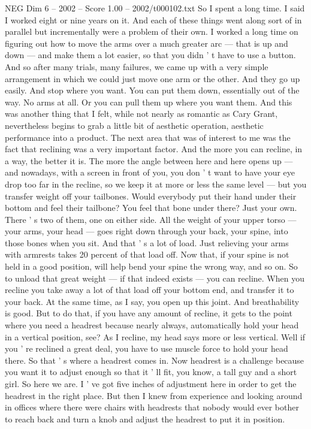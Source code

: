 \begin{textsample}{NEG Dim 6 – 2002 – Score 1.00 – 2002/t000102.txt}
So I spent a long time.
I said I worked eight or nine years on it.
And each of these things went along sort of in parallel but incrementally were a problem of their own.
I worked a long time on figuring out how to move the arms over a much greater arc — that is up and down — and make them a lot easier, so that you didn ' t have to use a button.
And so after many trials, many failures, we came up with a very simple arrangement in which we could just move one arm or the other.
And they go up easily.
And stop where you want.
You can put them down, essentially out of the way.
No arms at all.
Or you can pull them up where you want them.
And this was another thing that I felt, while not nearly as romantic as Cary Grant, nevertheless begins to grab a little bit of aesthetic operation, aesthetic performance into a product.
The next area that was of interest to me was the fact that reclining was a very important factor.
And the more you can recline, in a way, the better it is.
The more the angle between here and here opens up — and nowadays, with a screen in front of you, you don ' t want to have your eye drop too far in the recline, so we keep it at more or less the same level — but you transfer weight off your tailbones.
Would everybody put their hand under their bottom and feel their tailbone?
You feel that bone under there?
Just your own.
There ' s two of them, one on either side.
All the weight of your upper torso — your arms, your head — goes right down through your back, your spine, into those bones when you sit.
And that ' s a lot of load.
Just relieving your arms with armrests takes 20 percent of that load off.
Now that, if your spine is not held in a good position, will help bend your spine the wrong way, and so on.
So to unload that great weight — if that indeed exists — you can recline.
When you recline you take away a lot of that load off your bottom end, and transfer it to your back.
At the same time, as I say, you open up this joint.
And breathability is good.
But to do that, if you have any amount of recline, it gets to the point where you need a headrest because nearly always, automatically hold your head in a vertical position, see?
As I recline, my head says more or less vertical.
Well if you ' re reclined a great deal, you have to use muscle force to hold your head there.
So that ' s where a headrest comes in.
Now headrest is a challenge because you want it to adjust enough so that it ' ll fit, you know, a tall guy and a short girl.
So here we are.
I ' ve got five inches of adjustment here in order to get the headrest in the right place.
But then I knew from experience and looking around in offices where there were chairs with headrests that nobody would ever bother to reach back and turn a knob and adjust the headrest to put it in position.

\end{textsample}
